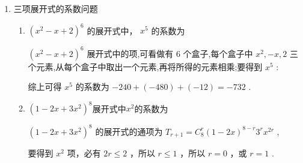 \begin{enumerate}
\begin{enumerate}
\begin{jieda}
            所以 ${a}_{1} + {a}_{3} + {a}_{5} + \cdots  + {a}_{2025} = \dfrac{1 + {3}^{2025}}{2}$ ,故 ${C}$ 正确;
            
            令 $x = \dfrac{1}{2}$ ，得 ${a}_{0} + \dfrac{{a}_{1}}{2} + \dfrac{{a}_{2}}{{2}^{2}} + \dfrac{{a}_{3}}{{2}^{3}} + \cdots  + \dfrac{{a}_{2025}}{{2}^{2025}} = {\left( 2 \times  \dfrac{1}{2} - 1\right) }^{2025} = 0$ ，所以 D 不正确.
        \end{jieda}
    \end{enumerate}
    
    \item 三项展开式的系数问题
    \begin{enumerate}
        \item  ${\left( {x}^{2} - x + 2\right) }^{6}$ 的展开式中， ${x}^{5}$ 的系数为
        \begin{jieda}
            ${\left( {x}^{2} - x + 2\right) }^{6}$ 展开式中的项,可看做有 6 个盒子,每个盒子中 ${x}^{2}, - x,2$ 三个元素,从每个盒子中取出一个元素,再将所得的元素相乘;要得到 ${x}^{5}$ :
            综上可得 ${x}^{5}$ 的系数为 $- {240} + \left( {-{480}}\right)  + \left( {-{12}}\right)  =  - {732}$ .
        \end{jieda}
        \item ${\left( 1 - 2x + 3{x}^{2}\right) }^{8}$展开式中$x^2$的系数为
        \begin{jieda}
            ${\left( 1 - 2x + 3{x}^{2}\right) }^{8}$ 的展开式的通项为 ${T}_{r + 1} = {{C}}_{8}^{r}{\left( 1 - 2x\right) }^{8 - r}{3}^{r}{x}^{2r}$ ,
            
            要得到 ${x}^{2}$ 项，必有 ${2r} \leq  2$ ，所以 $r \leq  1$ ，所以 $r = 0$ ，或 $r = 1$ .
            

\end{jieda}
\end{enumerate}
\end{enumerate}
